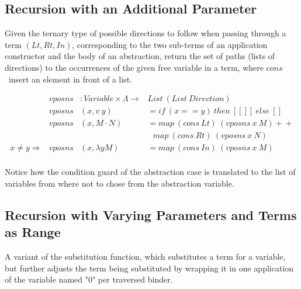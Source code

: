 \documentclass{entcs}
\begin{document}
\hspace{5px}

 \hspace{5px}

\subsection{Recursion with an Additional Parameter}

Given the ternary type of possible directions to follow when passing through a term $({Lt, Rt, In})$, corresponding to the two sub-terms of an application constructor and the body of an abstraction, return the set of paths (lists of directions) to the occurrences of the given free variable in a term, where $cons$\ insert an element in front of a list.

\[
\begin{array}{rrll}
&vposns &: Variable \times \Lambda \rightarrow & List\ (List\ Direction) \\
&vposns &(x , v\ y)         &= if\ (x == y)\ then\ [[]]\ else\ []   \\
&vposns &(x , M \cdot N)    &= map\ (cons\ Lt)\ (vposns\ x\ M) +\!\!+  \\
& & &\ \ \ map\ (cons\ Rt)\ (vposns\ x\ N) \\
x \neq y \Rightarrow&vposns &(x ,\lambda y M)   &= map\ (cons\ In)\ (vposns\ x\ M) \\
\end{array} \]

Notice how the condition guard of the abstraction case is translated to the list of variables from where not to chose from the abstraction variable.

 \hspace{5px}

\subsection{Recursion with Varying Parameters and Terms as Range}

A variant of the substitution function, which substitutes a term for a variable, but further adjusts the term being substituted by wrapping it in one application of the variable named "0" per traversed binder.
\end{document}
